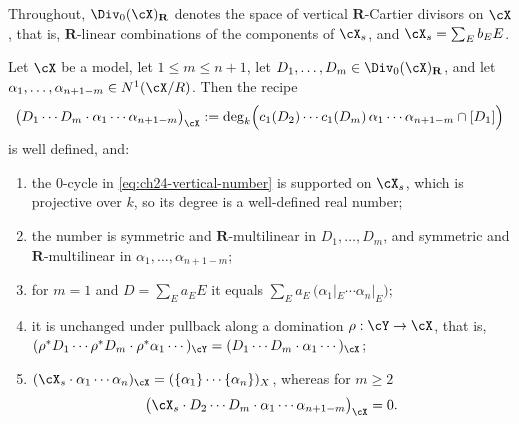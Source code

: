 Throughout, \(\Div_0(\cX)_{\mathbf R}\) denotes the space of vertical
\(\mathbf R\)-Cartier divisors on \(\cX\), that is, \(\mathbf R\)-linear
combinations of the components of \(\cX_s\), and \(\cX_s=\sum_Eb_EE\).

\begin{lemma}
\label{lem:ch24-vertical-numbers}
Let \(\cX\) be a model, let \(1\leq m\leq n+1\), let
\(D_1,\ldots,D_m\in\Div_0(\cX)_{\mathbf R}\), and let
\(\alpha_1,\ldots,\alpha_{n+1-m}\in N^1(\cX/R)\).  Then the recipe
\begin{equation}
\label{eq:ch24-vertical-number}
 \bigl(D_1\cdots D_m\cdot\alpha_1\cdots\alpha_{n+1-m}\bigr)_{\cX}
 :=\deg_k\Bigl(
   c_1(D_2)\cdots c_1(D_m)\,\alpha_1\cdots\alpha_{n+1-m}\cap[D_1]
   \Bigr)
\end{equation}
is well defined, and:
\begin{enumerate}
\item\label{itm:ch24-vn:welldef} the \(0\)-cycle in
 \eqref{eq:ch24-vertical-number} is supported on \(\cX_s\), which is
 projective over \(k\), so its degree is a well-defined real number;
\item\label{itm:ch24-vn:sym} the number is symmetric and
 \(\mathbf R\)-multilinear in \(D_1,\ldots,D_m\), and symmetric and
 \(\mathbf R\)-multilinear in \(\alpha_1,\ldots,\alpha_{n+1-m}\);
\item\label{itm:ch24-vn:m1} for \(m=1\) and \(D=\sum_Ea_EE\) it equals
 \(\sum_Ea_E\,\bigl(\alpha_1|_E\cdots\alpha_n|_E\bigr)\);
\item\label{itm:ch24-vn:pullback} it is unchanged under pullback along a
 domination \(\rho:\cY\to\cX\), that is,
 \((\rho^*D_1\cdots\rho^*D_m\cdot\rho^*\alpha_1\cdots)_{\cY}
   =(D_1\cdots D_m\cdot\alpha_1\cdots)_{\cX}\);
\item\label{itm:ch24-vn:fibre} \((\cX_s\cdot\alpha_1\cdots\alpha_n)_{\cX}
 =(\{\alpha_1\}\cdots\{\alpha_n\})_X\), whereas for \(m\geq2\)
 \[
  \bigl(\cX_s\cdot D_2\cdots D_m\cdot\alpha_1\cdots\alpha_{n+1-m}\bigr)_{\cX}
  =0 .
 \]
\end{enumerate}
\end{lemma}

